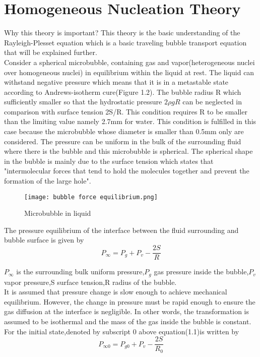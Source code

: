 \section{Homogeneous Nucleation Theory}
Why this theory is important?  This theory is the basic understanding
of the Rayleigh-Plesset equation which is a basic traveling bubble
transport equation that will be explained further.\\ Consider a
spherical microbubble, containing gas and vapor(heterogeneous nuclei
over homogeneous nuclei) in equilibrium within the liquid at
rest. The liquid can withstand negative pressure which means that it
is in a metastable state according to Andrews-isotherm cure(Figure
1.2). The bubble radius R which sufficiently smaller so that the
hydrostatic pressure $2\rho gR$ can be neglected in comparison with
surface tension 2S/R. This condition requires R to be smaller than
the limiting value namely 2.7mm for water. This condition is
fulfilled in this case because the microbubble whose diameter is
smaller than 0.5mm only are considered. The pressure can be uniform
in the bulk of the surrounding fluid where there is the bubble and
this microbubble is spherical. The spherical shape in the bubble is
mainly due to the surface tension which states that "intermolecular
forces that tend to hold the molecules together and prevent the
formation of the large hole".\\

\begin{figure}[H]
    \centering
    \texttt{[image: bubble force equilibrium.png]}
    \caption{Microbubble in liquid}
    \label{fig:fig3}
\end{figure}

The pressure equilibrium of the interface between the fluid
surrounding and bubble surface is given by\\
\begin{equation}
P_{\infty} =P_g + P_v -\frac{2S}{R}
\end{equation}

${P_\infty}$ is the surrounding bulk uniform pressure,$P_g$ gas
pressure inside the bubble,$P_v$vapor pressure,S surface tension,R
radius of the bubble.\\ It is assumed that pressure change is slow
enough to achieve mechanical equilibrium. However, the change in
pressure must be rapid enough to ensure the gas diffusion at the
interface is negligible.  In other words, the transformation is
assumed to be isothermal and the mass of the gas inside the bubble is
constant.\\ For the initial state,denoted by subscript 0 above
equation(1.1)is written by
\begin{equation}
P_{{\infty}{0}} =P_{g0}+P_v-\frac{2S}{R_0}
\end{equation}

